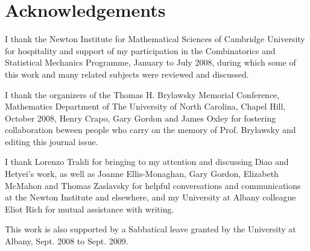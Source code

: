 \documentclass[12pt,leqno]{amsart}
\theoremstyle{remark}
\begin{document}
\section{Acknowledgements}

I thank
the Newton Institute for Mathematical Sciences
of Cambridge University for hospitality and support of my
participation in the Combinatorics and Statistical Mechanics
Programme, January to July 2008, during which some of this
work and many related subjects were reviewed and discussed.

I thank the organizers of 
the Thomas H. Brylawsky Memorial Conference, Mathematics Department of
The University of North Carolina, Chapel Hill, October 2008, 
Henry Crapo, Gary Gordon and James Oxley
for
fostering collaboration beween people who carry
on the memory of Prof. Brylawsky and editing this journal
issue.  

I thank Lorenzo Traldi for bringing to my attention and
discussing Diao and Hetyei's work, as well as
Joanne Ellis-Monaghan, Gary Gordon, Elizabeth McMahon
and Thomas Zaslavsky for helpful conversations and communications
at the Newton Institute and elsewhere, and
my University at Albany colleague Eliot Rich for mutual assistance with
writing.

This work is also supported by a Sabbatical leave granted
by the University at Albany, Sept. 2008 to Sept. 2009.





\end{document}
